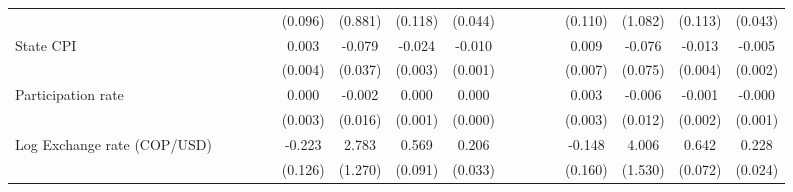 \begin{tabular}{lcccccccccccccccc}
                    &                     &                     &                     &                     &     (0.096)         &     (0.881)         &     (0.118)         &     (0.044)         &                     &                     &                     &                     &     (0.110)         &     (1.082)         &     (0.113)         &     (0.043)         \\
\addlinespace
State CPI           &                     &                     &                     &                     &       0.003         &      -0.079\sym{*}  &      -0.024\sym{***}&      -0.010\sym{***}&                     &                     &                     &                     &       0.009         &      -0.076         &      -0.013\sym{**} &      -0.005\sym{**} \\
                    &                     &                     &                     &                     &     (0.004)         &     (0.037)         &     (0.003)         &     (0.001)         &                     &                     &                     &                     &     (0.007)         &     (0.075)         &     (0.004)         &     (0.002)         \\
\addlinespace
Participation rate  &                     &                     &                     &                     &       0.000         &      -0.002         &       0.000         &       0.000         &                     &                     &                     &                     &       0.003         &      -0.006         &      -0.001         &      -0.000         \\
                    &                     &                     &                     &                     &     (0.003)         &     (0.016)         &     (0.001)         &     (0.000)         &                     &                     &                     &                     &     (0.003)         &     (0.012)         &     (0.002)         &     (0.001)         \\
\addlinespace
Log Exchange rate (COP/USD)&                     &                     &                     &                     &      -0.223         &       2.783\sym{*}  &       0.569\sym{***}&       0.206\sym{***}&                     &                     &                     &                     &      -0.148         &       4.006\sym{**} &       0.642\sym{***}&       0.228\sym{***}\\
                    &                     &                     &                     &                     &     (0.126)         &     (1.270)         &     (0.091)         &     (0.033)         &                     &                     &                     &                     &     (0.160)         &     (1.530)         &     (0.072)         &     (0.024)         \\

\end{tabular}
